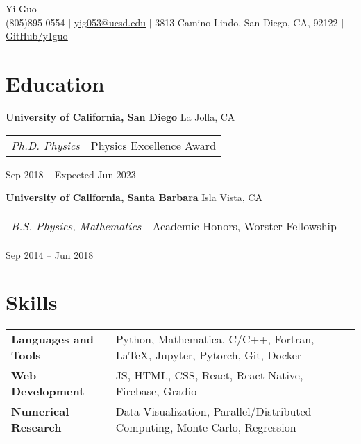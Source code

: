 \documentclass[letterpaper,12pt]{article}
\begin{document}
\newcommand{\name}{Yi Guo}
\newcommand{\phone}{(805)895-0554}
\newcommand{\email}{yig053@ucsd.edu}
\newcommand{\address}{3813 Camino Lindo, San Diego, CA, 92122}
\newcommand{\github}{y1guo}
\newcommand{\linkedin}{y1guo}
\newcommand{\website}{https://y1guo.github.io}

\begin{center}
    \Huge \name \\
    \vspace{1pt}
    \small \phone 
    $|$ \href{mailto:\email}{\underline{\email}} 
    $|$ \address
    $|$ \href{https://github.com/\github}{\underline{GitHub/\github}} 
    \vspace{-15pt}
\end{center}


\section{Education}

\textbf{University of California, San Diego} \hfill La Jolla, CA \\
\begin{tabular}{p{12em} p{20em}}
    \textit{Ph.D. Physics} 
    & Physics Excellence Award 
\end{tabular}
\hfill Sep 2018 -- Expected Jun 2023

\textbf{University of California, Santa Barbara} \hfill Isla Vista, CA \\
\begin{tabular}{p{12em} p{20em}}
    \textit{B.S. Physics, Mathematics}
    & Academic Honors, Worster Fellowship
\end{tabular}
\hfill Sep 2014 -- Jun 2018


\section{Skills}

\begin{tabular}{p{10em} p{33em}}
    \textbf{Languages and Tools} 
    & Python, Mathematica, C/C++, Fortran, \LaTeX, Jupyter, Pytorch, Git, Docker \\
    \textbf{Web Development}
    & JS, HTML, CSS, React, React Native, Firebase, Gradio \\
    \textbf{Numerical Research} 
    & Data Visualization, Parallel/Distributed Computing, Monte Carlo, Regression \\
\end{tabular}
\end{document}

